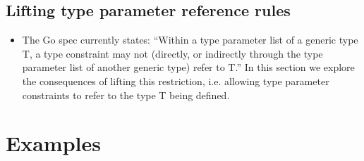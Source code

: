 \documentclass[12pt]{article}
\begin{document}
\subsection{Lifting type parameter reference rules}

\begin{itemize}
    \item The Go spec currently states: ``Within a type
          parameter list of a generic type T, a type constraint may not
          (directly, or indirectly through the type parameter list of another
          generic type) refer to T.'' In this section we explore the
          consequences of lifting this restriction, i.e. allowing type parameter
          constraints to refer to the type T being defined.
\end{itemize}

\section{Examples}


\end{document}
